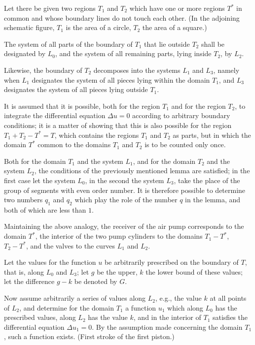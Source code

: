 \documentclass{article}
\begin{document}
Let there be given two regions $T_1$ and $T_2$ which have one or more regions $T^*$ in common and whose boundary lines do not touch each other. (In the adjoining schematic figure, $T_1$ is the area of a circle, $T_2$ the area of a square.)

The system of all parts of the boundary of $T_1$ that lie outside $T_2$ shall be designated by $L_0$, and the system of all remaining parts, lying inside $T_2$, by $L_2$.

Likewise, the boundary of $T_2$ decomposes into the systems $L_1$ and $L_3$, namely when $L_1$ designates the system of all pieces lying within the domain $T_1$, and $L_3$ designates the system of all pieces lying outside $T_1$.

It is assumed that it is possible, both for the region $T_1$ and for the region $T_2$, to integrate the differential equation $\Delta u = 0$ according to arbitrary boundary conditions; it is a matter of showing that this is also possible for the region $T_1 + T_2 - T^* = T$, which contains the regions $T_1$ and
$T_2$ as parts, but in which the domain $T^*$ common to the domains $T_1$ and $T_2$ is to be counted only once.

Both for the domain $T_1$ and the system $L_1$, and for the domain $T_2$ and the system $L_2$, the conditions of the previously mentioned lemma are satisfied; in the first case let the system $L_0$, in the second the system $L_3$, take the place of the group of segments with even order number. It is therefore possible to determine two numbers $q_1$ and $q_2$ which play the role of the number $q$ in the lemma, and both of which are less than $1$.

Maintaining the above analogy, the receiver of the air pump corresponds to the domain $T^*$, the interior of the two pump cylinders to the domains $T_1 - T^*$, $T_2 - T^*$, and the valves to the curves $L_1$ and $L_2$.

Let the values for the function $u$ be arbitrarily prescribed on the boundary of $T$, that is, along $L_0$ and $L_3$; let $g$ be the upper, $k$ the lower bound of these values; let the difference $g - k$ be denoted by $G$.

Now assume arbitrarily a series of values along $L_2$, e.g., the value $k$ at all points of $L_2$, and determine for the domain $T_1$ a function $u_1$ which along $L_0$ has the prescribed values, along $L_2$ has the value $k$, and in the interior of $T_1$ satisfies the differential equation $\Delta u_1 = 0$. By the assumption made concerning the domain $T_1$, such a function exists. (First stroke of the first piston.)
\end{document}
